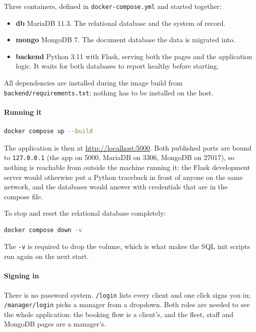 \documentclass[a4paper, 11pt]{article}          %
\begin{document}
Three containers, defined in \texttt{docker-compose.yml} and started together:

\begin{itemize}
  \item \textbf{db} \textendash{} MariaDB 11.3. The relational database and the
        system of record.
  \item \textbf{mongo} \textendash{} MongoDB 7. The document database the data
        is migrated into.
  \item \textbf{backend} \textendash{} Python 3.11 with Flask, serving both the
        pages and the application logic. It waits for both databases to report
        healthy before starting.
\end{itemize}

All dependencies are installed during the image build from
\texttt{backend/requirements.txt}; nothing has to be installed on the host.

\paragraph{Running it}

\begin{lstlisting}[language=bash]
docker compose up --build
\end{lstlisting}

The application is then at \url{http://localhost:5000}. Both published ports are
bound to \texttt{127.0.0.1} (the app on 5000, MariaDB on 3306, MongoDB on 27017),
so nothing is reachable from outside the machine running it: the Flask
development server would otherwise put a Python traceback in front of anyone on
the same network, and the databases would answer with credentials that are in
the compose file.

To stop and reset the relational database completely:

\begin{lstlisting}[language=bash]
docker compose down -v
\end{lstlisting}

The \texttt{-v} is required to drop the volume, which is what makes the SQL init
scripts run again on the next start.

\paragraph{Signing in} There is no password system. \texttt{/login} lists every
client and one click signs you in; \texttt{/manager/login} picks a manager from
a dropdown. Both roles are needed to see the whole application: the booking
flow is a client's, and the fleet, staff and MongoDB pages are a manager's.
\end{document}
